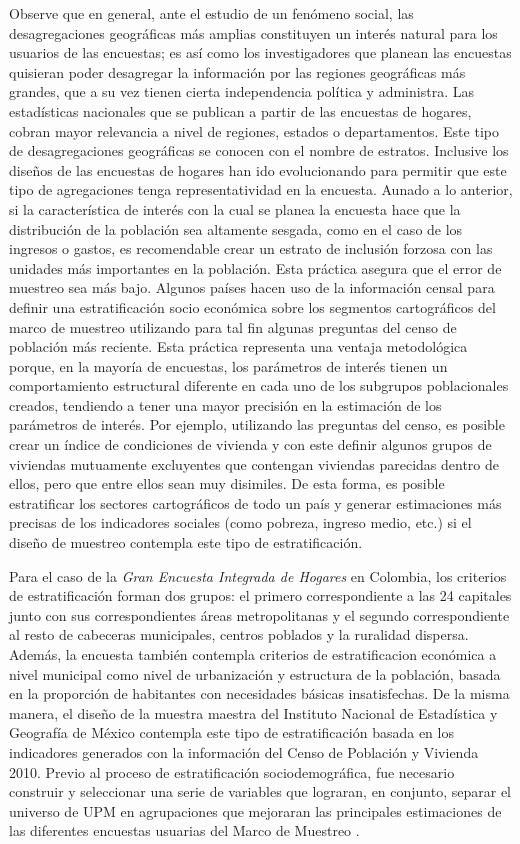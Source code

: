 \documentclass[12pt,spanish,]{book}
\begin{document}
Observe que en general, ante el estudio de un fenómeno social, las desagregaciones geográficas más amplias constituyen un interés natural para los usuarios de las encuestas; es así como los investigadores que planean las encuestas quisieran poder desagregar la información por las regiones geográficas más grandes, que a su vez tienen cierta independencia política y administra. Las estadísticas nacionales que se publican a partir de las encuestas de hogares, cobran mayor relevancia a nivel de regiones, estados o departamentos. Este tipo de desagregaciones geográficas se conocen con el nombre de estratos. Inclusive los diseños de las encuestas de hogares han ido evolucionando para permitir que este tipo de agregaciones tenga representatividad en la encuesta. Aunado a lo anterior, si la característica de interés con la cual se planea la encuesta hace que la distribución de la población sea altamente sesgada, como en el caso de los ingresos o gastos, es recomendable crear un estrato de inclusión forzosa con las unidades más importantes en la población. Esta práctica asegura que el error de muestreo sea más bajo. Algunos países hacen uso de la información censal para definir una estratificación socio económica sobre los segmentos cartográficos del marco de muestreo utilizando para tal fin algunas preguntas del censo de población más reciente. Esta práctica representa una ventaja metodológica porque, en la mayoría de encuestas, los parámetros de interés tienen un comportamiento estructural diferente en cada uno de los subgrupos poblacionales creados, tendiendo a tener una mayor precisión en la estimación de los parámetros de interés. Por ejemplo, utilizando las preguntas del censo, es posible crear un índice de condiciones de vivienda y con este definir algunos grupos de viviendas mutuamente excluyentes que contengan viviendas parecidas dentro de ellos, pero que entre ellos sean muy disimiles. De esta forma, es posible estratificar los sectores cartográficos de todo un país y generar estimaciones más precisas de los indicadores sociales (como pobreza, ingreso medio, etc.) si el diseño de muestreo contempla este tipo de estratificación.

Para el caso de la \emph{Gran Encuesta Integrada de Hogares} en Colombia, los criterios de estratificación forman dos grupos: el primero correspondiente a las 24 capitales junto con sus correspondientes áreas metropolitanas y el segundo correspondiente al resto de cabeceras municipales, centros poblados y la ruralidad dispersa. Además, la encuesta también contempla criterios de estratificacion económica a nivel municipal como nivel de urbanización y estructura de la población, basada en la proporción de habitantes con necesidades básicas insatisfechas. De la misma manera, el diseño de la muestra maestra del Instituto Nacional de Estadística y Geografía de México contempla este tipo de estratificación basada en los indicadores generados con la información del Censo de Población y Vivienda 2010. Previo al proceso de estratificación sociodemográfica, fue necesario construir y seleccionar una serie de variables que lograran, en conjunto, separar el universo de UPM en agrupaciones que mejoraran las principales estimaciones de las diferentes encuestas usuarias del Marco de Muestreo \autocite{INEGI_MX_2012}.
\end{document}
